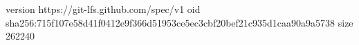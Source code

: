 version https://git-lfs.github.com/spec/v1
oid sha256:715f107e58d41f0412e9f366d51953ce5ec3cbf20bef21c935d1caa90a9a5738
size 262240
